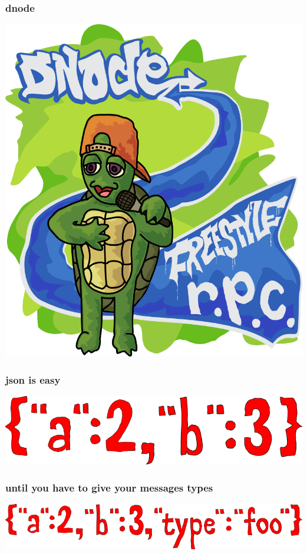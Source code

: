 \documentclass{beamer}
\begin{document}
\begin{frame}
    \frametitle{dnode}
    \begin{center}
        \includegraphics[scale=0.3]{images/freestyle_turtle.png}
    \end{center}
\end{frame}

\begin{frame}
    \frametitle{json is easy}
    \includegraphics[scale=0.6]{images/json.png}
\end{frame}

\begin{frame}
    \frametitle{until you have to give your messages types}
    \includegraphics[scale=0.6]{images/json_type.png}
\end{frame}
\end{document}
